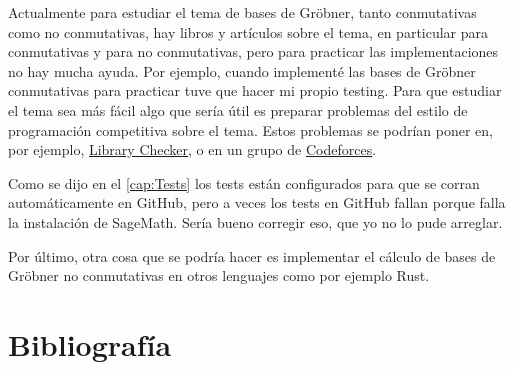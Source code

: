 \documentclass[12pt]{report}
\theoremstyle{customstyle}
\theoremstyle{factstyle}
\begin{document}
Actualmente para estudiar el tema de bases de Gröbner, tanto conmutativas como no conmutativas, hay libros y artículos sobre el tema, en particular \cite{book:ideals-varieties-algorithms} para conmutativas y \cite{thesis:Hof20} para no conmutativas, pero para practicar las implementaciones no hay mucha ayuda. Por ejemplo, cuando implementé las bases de Gröbner conmutativas para practicar tuve que hacer mi propio testing. Para que estudiar el tema sea más fácil algo que sería útil es preparar problemas del estilo de programación competitiva sobre el tema. Estos problemas se podrían poner en, por ejemplo, \href{https://judge.yosupo.jp}{Library Checker}, o en un grupo de \href{https://codeforces.com}{Codeforces}.

Como se dijo en el \cref{cap:Tests} los tests están configurados para que se corran automáticamente en GitHub, pero a veces los tests en GitHub fallan porque falla la instalación de SageMath. Sería bueno corregir eso, que yo no lo pude arreglar.

Por último, otra cosa que se podría hacer es implementar el cálculo de bases de Gröbner no conmutativas en otros lenguajes como por ejemplo Rust.

\chapter*{Bibliografía}

\printbibliography[heading=none]
\end{document}
